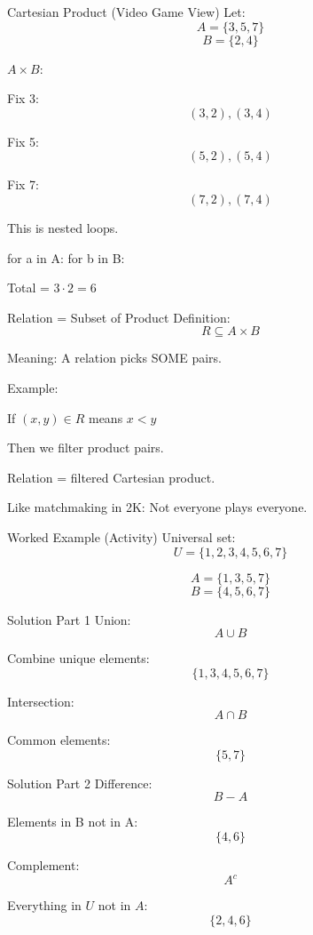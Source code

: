 \documentclass[landscape]{beamer}
\begin{document}
\begin{frame}{Cartesian Product (Video Game View)}
Let:
\[
A = \{3,5,7\}
\]
\[
B = \{2,4\}
\]

$A \times B$:

Fix 3:
\[
(3,2),(3,4)
\]

Fix 5:
\[
(5,2),(5,4)
\]

Fix 7:
\[
(7,2),(7,4)
\]

This is nested loops.

for a in A:
\quad for b in B:

Total = $3 \cdot 2 = 6$
\end{frame}

\begin{frame}{Relation = Subset of Product}
Definition:
\[
R \subseteq A \times B
\]

Meaning:
A relation picks SOME pairs.

Example:

If $(x,y) \in R$ means $x<y$

Then we filter product pairs.

Relation = filtered Cartesian product.

Like matchmaking in 2K:
Not everyone plays everyone.
\end{frame}

\begin{frame}{Worked Example (Activity)}
Universal set:
\[
U=\{1,2,3,4,5,6,7\}
\]

\[
A=\{1,3,5,7\}
\]
\[
B=\{4,5,6,7\}
\]
\end{frame}

\begin{frame}{Solution Part 1}
Union:
\[
A \cup B
\]

Combine unique elements:
\[
\{1,3,4,5,6,7\}
\]

Intersection:
\[
A \cap B
\]

Common elements:
\[
\{5,7\}
\]
\end{frame}

\begin{frame}{Solution Part 2}
Difference:
\[
B-A
\]

Elements in B not in A:
\[
\{4,6\}
\]

Complement:
\[
A^c
\]

Everything in $U$ not in $A$:
\[
\{2,4,6\}
\]
\end{frame}
\end{document}

